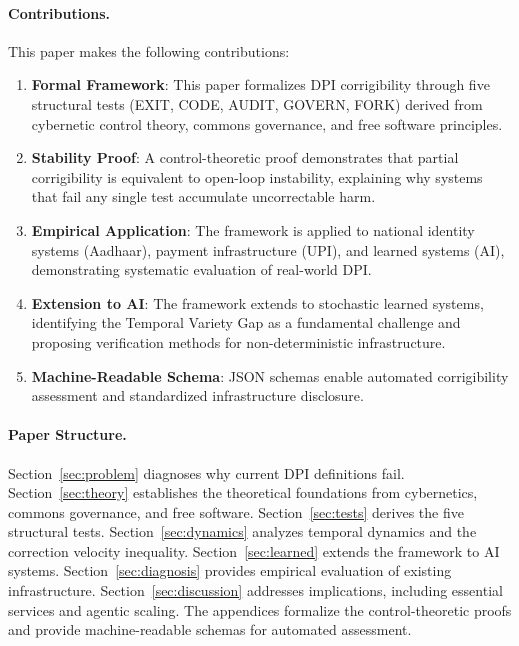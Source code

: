 \paragraph{Contributions.} This paper makes the following contributions:
\begin{enumerate}[noitemsep]
    \item \textbf{Formal Framework}: This paper formalizes DPI corrigibility through five structural tests (EXIT, CODE, AUDIT, GOVERN, FORK) derived from cybernetic control theory, commons governance, and free software principles.
    \item \textbf{Stability Proof}: A control-theoretic proof demonstrates that partial corrigibility is equivalent to open-loop instability, explaining why systems that fail any single test accumulate uncorrectable harm.
    \item \textbf{Empirical Application}: The framework is applied to national identity systems (Aadhaar), payment infrastructure (UPI), and learned systems (AI), demonstrating systematic evaluation of real-world DPI.
    \item \textbf{Extension to AI}: The framework extends to stochastic learned systems, identifying the Temporal Variety Gap as a fundamental challenge and proposing verification methods for non-deterministic infrastructure.
    \item \textbf{Machine-Readable Schema}: JSON schemas enable automated corrigibility assessment and standardized infrastructure disclosure.
\end{enumerate}

\paragraph{Paper Structure.} Section~\ref{sec:problem} diagnoses why current DPI definitions fail. Section~\ref{sec:theory} establishes the theoretical foundations from cybernetics, commons governance, and free software. Section~\ref{sec:tests} derives the five structural tests. Section~\ref{sec:dynamics} analyzes temporal dynamics and the correction velocity inequality. Section~\ref{sec:learned} extends the framework to AI systems. Section~\ref{sec:diagnosis} provides empirical evaluation of existing infrastructure. Section~\ref{sec:discussion} addresses implications, including essential services and agentic scaling. The appendices formalize the control-theoretic proofs and provide machine-readable schemas for automated assessment.

